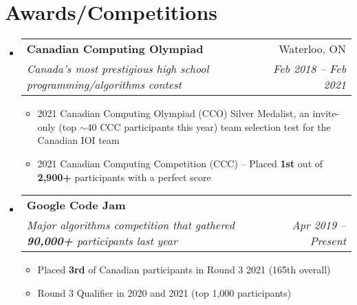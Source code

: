\documentclass[letterpaper,11pt]{article}
\makeatletter
\newcommand{\resumeText}[1]{
  \item\small{
    \textbf{}{#1 \vspace{-2pt}}
  }
}
\newcommand{\resumeSubheading}[4]{
  \vspace{-1pt}\item
    \begin{tabular*}{0.97\textwidth}[t]{l@{\extracolsep{\fill}}r}
      \textbf{#1} & #2 \\
      \textit{\small#3} & \textit{\small #4} \\
    \end{tabular*}\vspace{-5pt}
}
\newcommand{\resumeSubHeadingListStart}{\begin{itemize}[leftmargin=*]}
\newcommand{\resumeSubHeadingListEnd}{\end{itemize}}
\newcommand{\resumeItemListStart}{\begin{itemize}}
\newcommand{\resumeItemListEnd}{\end{itemize}\vspace{-5pt}}
\makeatother
\begin{document}
\section{Awards/Competitions}
  \resumeSubHeadingListStart
    \resumeSubheading
      {Canadian Computing Olympiad}{Waterloo, ON}
      {Canada's most prestigious high school programming/algorithms contest}{Feb 2018 -- Feb 2021}
      \resumeItemListStart
        \resumeText{2021 Canadian Computing Olympiad (CCO) Silver Medalist, an invite-only (top $\sim$40 CCC participants this year) team selection test for the Canadian IOI team}
        \resumeText{2021 Canadian Computing Competition (CCC) -- Placed \textbf{1st} out of \textbf{2,900+} participants with a perfect score}
      \resumeItemListEnd

    \resumeSubheading
      {Google Code Jam}{}
      {Major algorithms competition that gathered \textbf{90,000+} participants last year}{Apr 2019 -- Present}
      \resumeItemListStart
        \resumeText{Placed \textbf{3rd} of Canadian participants in Round 3 2021 (165th overall)}
        \resumeText{Round 3 Qualifier in 2020 and 2021 (top 1,000 participants)}
      \resumeItemListEnd
    
  \resumeSubHeadingListEnd

\end{document}
